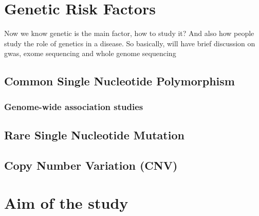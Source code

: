 \section{Genetic Risk Factors}
Now we know genetic is the main factor, how to study it?
And also how people study the role of genetics in a disease.
So basically, will have brief discussion on gwas, exome sequencing and whole genome sequencing
\subsection{Common Single Nucleotide Polymorphism}
\subsubsection{Genome-wide association studies}
\subsection{Rare Single Nucleotide Mutation}
\subsection{Copy Number Variation (CNV)}

\section{Aim of the study}

